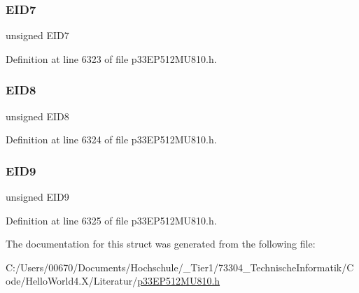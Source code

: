 \subsubsection{\texorpdfstring{E\+I\+D7}{EID7}}
{\footnotesize\ttfamily unsigned E\+I\+D7}



Definition at line 6323 of file p33\+E\+P512\+M\+U810.\+h.

\mbox{\label{structtag_c2_r_x_f2_e_i_d_b_i_t_s_acca25e0b7d86eb499d01f85222baea87}} 
\subsubsection{\texorpdfstring{E\+I\+D8}{EID8}}
{\footnotesize\ttfamily unsigned E\+I\+D8}



Definition at line 6324 of file p33\+E\+P512\+M\+U810.\+h.

\mbox{\label{structtag_c2_r_x_f2_e_i_d_b_i_t_s_ac6748f73d4ada8538b06548be4f396c2}} 
\subsubsection{\texorpdfstring{E\+I\+D9}{EID9}}
{\footnotesize\ttfamily unsigned E\+I\+D9}



Definition at line 6325 of file p33\+E\+P512\+M\+U810.\+h.



The documentation for this struct was generated from the following file\+:\begin{DoxyCompactItemize}
\item 
C\+:/\+Users/00670/\+Documents/\+Hochschule/\+\_\+\+Tier1/73304\+\_\+\+Technische\+Informatik/\+Code/\+Hello\+World4.\+X/\+Literatur/\hyperlink{p33_e_p512_m_u810_8h}{p33\+E\+P512\+M\+U810.\+h}\end{DoxyCompactItemize}
